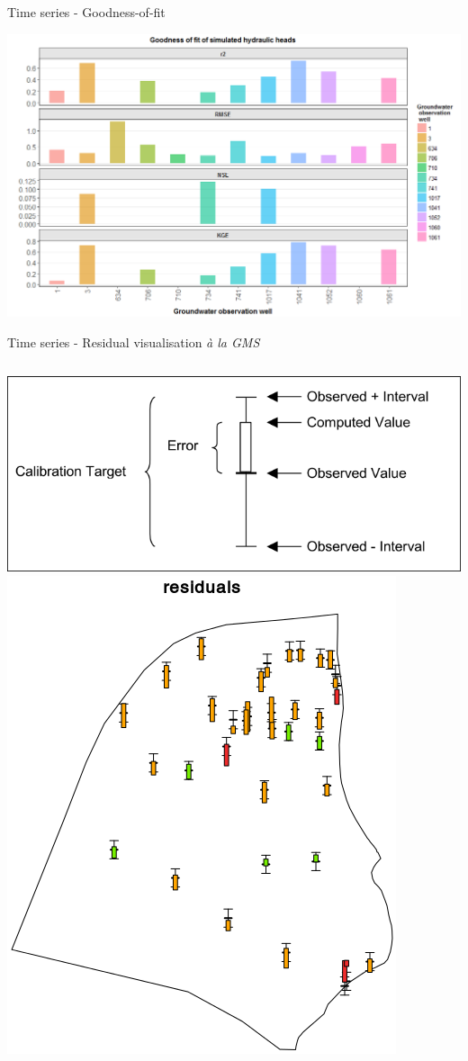 \documentclass[8pt,ignorenonframetext,]{beamer}
\newcommand{\columnsbegin}{\begin{columns}}
\newcommand{\columnsend}{\end{columns}}
\begin{document}
\begin{frame}{Time series - Goodness-of-fit}

\includegraphics{imgPres/time_series_head_analysis04.png}

\end{frame}

\begin{frame}{Time series - Residual visualisation \emph{à la GMS}}

\columnsbegin
{} \includegraphics{imgPres/ts_residuals.png}
\includegraphics{imgPres/ts_resdiuals_examples.png} \columnsend

\end{frame}
\end{document}
